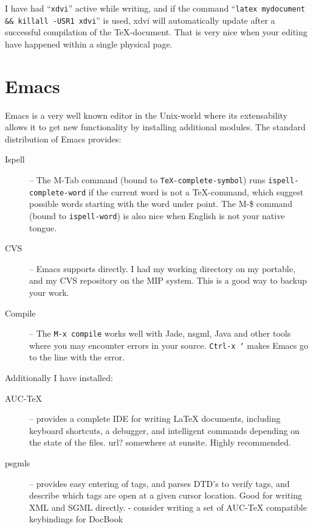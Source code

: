 I have had ``\texttt{xdvi}'' active while writing, and if the command
``\texttt{latex mydocument \&\& killall -USR1 xdvi}'' is used, xdvi
will automatically update after a successful compilation of the
TeX-document.  That is very nice when your editing have happened
within a single physical page.

\section{Emacs} 
\label{sec:report-writing-tools-emacs} 


Emacs is a very well known editor in the Unix-world where its
extensability allows it to get new functionality by installing
additional modules.  The standard distribution of Emacs provides:

\begin{description}
\item[Ispell] -- The M-Tab command (bound to
  \texttt{TeX-complete-symbol}) runs \texttt{ispell-complete-word} if
  the current word is not a {\TeX}-command, which suggest possible
  words starting with the word under point.  The M-\$ command (bound
  to \texttt{ispell-word}) is also nice when English is not your
  native tongue.
\item[CVS] -- Emacs supports  directly.  I
  had my working directory on my portable, and my CVS repository on
  the MIP system.  This is a good way to backup your work.
\item[Compile] -- The \texttt{M-x compile} works well with Jade,
  nsgml, Java and other tools where you may encounter errors in your
  source.  \texttt{Ctrl-x `} makes Emacs go to the line with the
  error.
  
\end{description}

Additionally I have installed:


\begin{description}
\item[AUC-TeX] -- provides a complete IDE for writing {\LaTeX}
  documents, including keyboard shortcuts, a debugger, and intelligent
  commands depending on the state of the files.  \textsf{url?
    somewhere at sunsite}.  Highly recommended.
\item[psgmls] -- provides easy entering of tags, and parses DTD's to
  verify tags, and describe which tags are open at a given cursor
  location.   Good for writing XML and SGML directly.
   - \textsf{consider writing a set of AUC-TeX
    compatible keybindings for DocBook}
\end{description}



